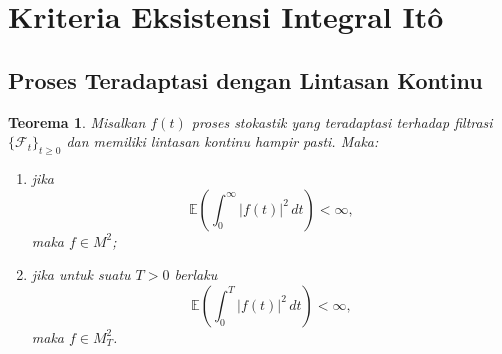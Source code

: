 \documentclass[12pt,a4paper]{article}
\theoremstyle{definition}
\theoremstyle{plain}
\newtheorem{teorema}[definisi]{Teorema}
\newcommand{\E}{\mathbb{E}}
\newcommand{\F}{\mathcal{F}}
\begin{document}
\section{Kriteria Eksistensi Integral It\^o}

\subsection{Proses Teradaptasi dengan Lintasan Kontinu}

\begin{teorema}
  Misalkan $f(t)$ proses stokastik yang teradaptasi terhadap filtrasi
  $\{\F_t\}_{t\ge 0}$ dan memiliki lintasan kontinu hampir pasti. Maka:
  \begin{enumerate}[label=\arabic*.]
    \item jika
          \[
            \E\left(\int_0^\infty |f(t)|^2\,dt\right)<\infty,
          \]
          maka $f\in M^2$;
    \item jika untuk suatu $T>0$ berlaku
          \[
            \E\left(\int_0^T |f(t)|^2\,dt\right)<\infty,
          \]
          maka $f\in M_T^2$.
  \end{enumerate}
\end{teorema}
\end{document}
